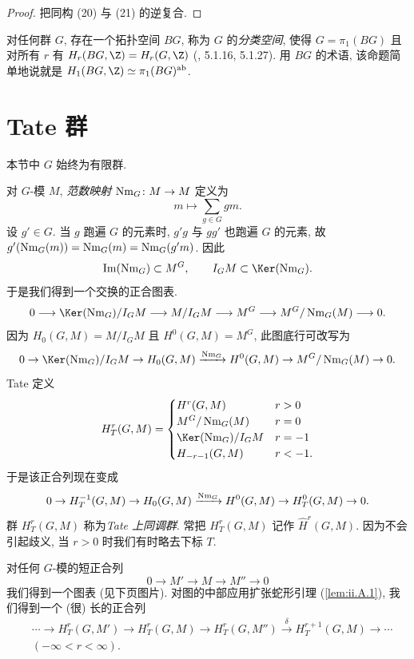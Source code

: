\begin{proof}
把同构 (20) 与 (21) 的逆复合.
\end{proof}

\begin{aside}\label{as:ii.2.8}
对任何群 $G$, 存在一个拓扑空间 $BG$, 称为 $G$ 的\emph{分类空间}, 使得 $G=\pi_1(BG)$ 且对所有 $r$ 有 $H_r(BG,\Z)=H_r(G,\Z)$ (\cite{Rosenberg1994}, 5.1.16, 5.1.27). 用 $BG$ 的术语, 该命题简单地说就是 $H_1(BG,\Z)\simeq \pi_1(BG)^{\mathrm{ab}}$.
\end{aside}

\section{Tate 群}\label{sec:II.3}

本节中 $G$ 始终为有限群.

对 $G$-模 $M$, \emph{范数映射} $\operatorname{Nm}_G\colon M\to M$ 定义为
\[
 m\mapsto \sum_{g\in G} g m.
\]
设 $g'\in G$. 当 $g$ 跑遍 $G$ 的元素时, $g'g$ 与 $gg'$ 也跑遍 $G$ 的元素, 故 $g'(\operatorname{Nm}_G(m))=\operatorname{Nm}_G(m)=\operatorname{Nm}_G(g'm)$. 因此
\[
 \Im(\Nm_G)\subset M^G,\qquad I_G M\subset \Ker(\Nm_G).
\]
于是我们得到一个交换的正合图表.
\[
 0\longrightarrow \Ker(\Nm_G)/I_G M\longrightarrow M/I_G M\longrightarrow M^G\longrightarrow M^G/\Nm_G(M)\longrightarrow 0.
\]
因为 $H_0(G,M)=M/I_G M$ 且 $H^0(G,M)=M^G$, 此图底行可改写为
\[
 0\to \Ker(\Nm_G)/I_G M\to H_0(G,M)\xrightarrow{\Nm_G} H^0(G,M)\to M^G/\Nm_G(M)\to 0.
\]
Tate 定义
\[
 H_T^r(G,M)=
 \begin{cases}
 H^r(G,M) & r>0\\
 M^G/\Nm_G(M) & r=0\\
 \Ker(\Nm_G)/I_G M & r=-1\\
 H_{-r-1}(G,M) & r<-1.
 \end{cases}
\]
于是该正合列现在变成
\[
 0\to H_T^{-1}(G,M)\to H_0(G,M)\xrightarrow{\operatorname{Nm}_G} H^0(G,M)\to H_T^0(G,M)\to 0.
\]
群 $H_T^r(G,M)$ 称为\emph{Tate 上同调群}. 常把 $H_T^r(G,M)$ 记作 $\hat H^r(G,M)$. 因为不会引起歧义, 当 $r>0$ 时我们有时略去下标 $T$.

对任何 $G$-模的短正合列
\[
 0\to M'\to M\to M''\to 0
\]
我们得到一个图表 (见下页图片). 对图的中部应用扩张蛇形引理 (\ref{lem:ii.A.1}), 我们得到一个 (很) 长的正合列
\begin{equation*}
 \begin{aligned}
 &\cdots\to H_T^r(G,M')\to H_T^r(G,M)\to H_T^r(G,M'')\xrightarrow{\delta} H_T^{r+1}(G,M)\to\cdots\\
 &(-\infty<r<\infty).
 \end{aligned}
\tag{22}
\end{equation*}

